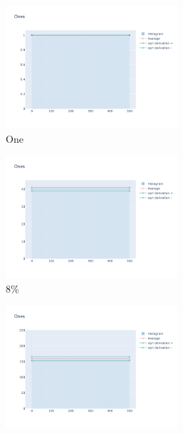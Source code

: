 \documentclass[12pt, fleqn]{report}                             %
\theoremstyle{break}                                            %
\begin{document}
        \begin{figure}[h!]
          \centering
          \begin{subfigure}[b]{0.4\linewidth}
            \includegraphics[width=0.7\textwidth]{Images/108/dia-a.png}
            \caption{One}
          \end{subfigure}
          \begin{subfigure}[b]{0.4\linewidth}
            \includegraphics[width=0.7\textwidth]{Images/108/dia-b.png}
            \caption{8\%}
          \end{subfigure}
          \begin{subfigure}[b]{0.4\linewidth}
            \includegraphics[width=0.7\textwidth]{Images/108/dia-c.png}

\end{subfigure}
\end{figure}
\end{document}
